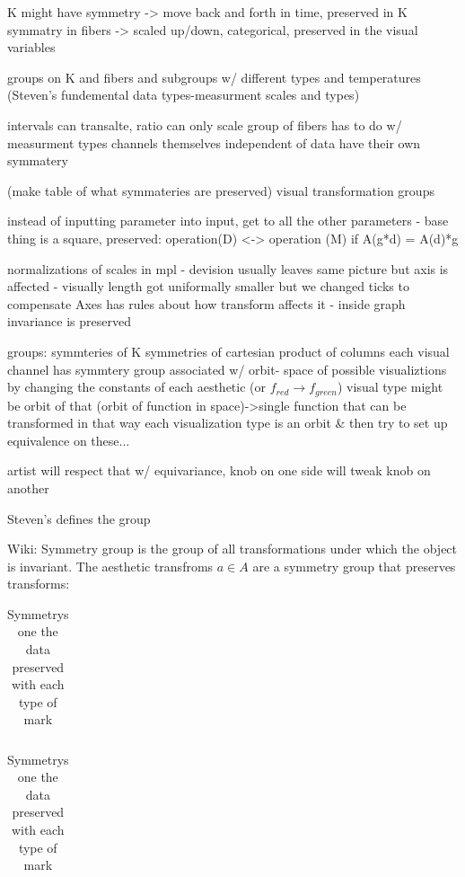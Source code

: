 \documentclass[letterpaper,onecolumn,titlepage]{Ythesis}
\begin{document}
K might have symmetry -> move back and forth in time, preserved in K
symmatry in fibers -> scaled up/down, categorical,
preserved in the visual variables

groups on K and fibers and subgroups w/ different types and temperatures (Steven's fundemental data types-measurment scales and types)

intervals can transalte, ratio can only scale
group of fibers has to do w/ measurment types
channels themselves independent of data have their own symmatery

(make table of what symmateries are preserved)
visual transformation groups

instead of inputting parameter into input, get to all the other parameters - base thing is a square, 
preserved: operation(D) <-> operation (M)
if A(g*d) = A(d)*g

normalizations of scales in mpl - devision usually leaves same picture but axis is affected - visually length got uniformally smaller but we changed ticks to compensate
Axes has rules about how transform affects it - inside graph invariance is preserved

groups:
symmteries of K
symmetries of cartesian product of columns
each visual channel has symmtery group associated w/
orbit- space of possible visualiztions by changing the constants of each aesthetic (or $f_{red} \rightarrow f_{green}$)  
visual type might be orbit of that (orbit of function in space)->single function that can be transformed in that way
each visualization type is an orbit \& then try to set up equivalence on these...

artist will respect that w/ equivariance, knob on one side will tweak knob on another

Steven's defines the group

Wiki: Symmetry group is the group of all transformations under which the object is invariant. 
The aesthetic transfroms $a \in A$ are a symmetry group that preserves transforms:

\begin{table}
    \label{tab:sym_mark}
    \begin{tabular}{|r|r|}
    \end{tabular}
\caption{Symmetrys one the data preserved with each type of mark\cite{bertinIIPropertiesGraphic2011,munznerMarksChannels}}
\end{table}

\begin{table}
    \label{tab:sym_mark}
    \begin{tabular}{|r|r|}
    \end{tabular}
\caption{Symmetrys one the data preserved with each type of mark\cite{bertinIIPropertiesGraphic2011,munznerMarksChannels}}
\end{table}
\end{document}
